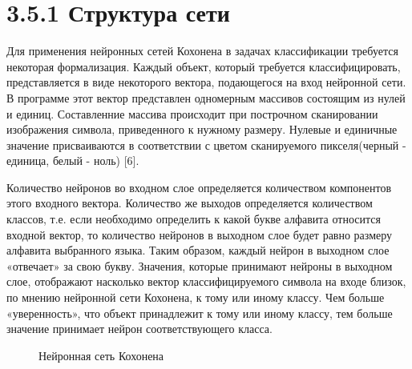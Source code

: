 \documentclass[14pt,a4paper]{extreport}
\begin{document}
                  \section*{\normalsize\hspace{4ex}3.5.1 Структура сети}
                  
  \hspace {4ex} Для применения нейронных сетей Кохонена в задачах классификации требуется некоторая формализация. Каждый объект, который требуется классифицировать, представляется в виде некоторого вектора, подающегося на вход нейронной сети. В программе этот вектор представлен одномерным массивов состоящим из нулей и единиц. Составленние массива происходит при построчном сканировании изображения символа, приведенного к нужному размеру. Нулевые и единичные значение присваиваются в соответствии с цветом сканируемого пикселя(черный - единица, белый - ноль) [6].\
  
  \hspace {4ex} Количество нейронов во входном слое определяется количеством компонентов этого входного вектора. Количество же выходов определяется количеством классов, т.е. если необходимо определить к какой букве алфавита относится входной вектор, то количество нейронов в выходном слое будет равно размеру алфавита выбранного языка. Таким образом, каждый нейрон в выходном слое «отвечает» за свою букву. Значения, которые принимают нейроны в выходном слое, отображают насколько вектор классифицируемого символа на входе близок, по мнению нейронной сети Кохонена, к тому или иному классу. Чем больше «уверенность», что объект принадлежит к тому или иному классу, тем больше значение принимает нейрон соответствующего класса.\
  
  \begin{figure}[h!]
\caption{Нейронная сеть Кохонена}
\end{figure}
  
\end{document}

